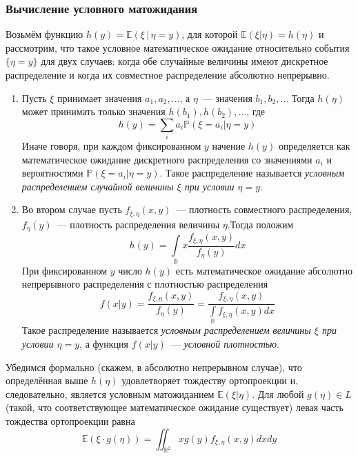 \subsubsection{Вычисление условного матожидания}
Возьмём функцию $h(y)=\mathbb{E}(\xi \,|\, \eta=y)$, для которой $\mathbb{E}(\xi | \eta)=h(\eta)$ и рассмотрим, что такое условное математическое ожидание относительно события $\{\eta=y\}$ для двух случаев: когда обе случайные величины имеют дискретное распределение и когда их совместное распределение абсолютно непрерывно.
\begin{enumerate}
    \item Пусть $\xi$ принимает значения $a_{1}, a_{2}, \ldots$, а $\eta$~--- значения $b_{1}, b_{2}, \ldots$ Тогда $h(\eta)$ может принимать только значения $h\left(b_{1}\right), h\left(b_{2}\right), \ldots$, где
    \begin{equation*}
        h(y)=\sum\limits_{i} a_{i} \mathbb{P}\left(\xi=a_{i} | \eta=y\right)
    \end{equation*}
    Иначе говоря, при каждом фиксированном $y$ начение $h(y)$ определяется как математическое ожидание дискретного распределения со значениями $a_{i}$ и вероятностями $\mathbb{P}\left(\xi=a_{i} | \eta=y\right)$. Такое распределение называется {\it условным распределением случайной величины $\xi$ при условии $\eta = y$}.
    
    \item Во втором случае пусть $f_{\xi, \eta}(x, y)$~--- плотность совместного распределения, $f_{\eta}(y)$~--- плотность распределения величины $\eta$.Тогда положим
    \begin{equation*}
        h(y)=\int\limits_{\mathbb{R}} x \frac{f_{\xi, \eta}(x, y)}{f_{\eta}(y)} d x
    \end{equation*}
    При фиксированном $y$ число $h(y)$ есть математическое ожидание абсолютно непрерывного распределения с плотностью распределения
    \begin{equation*}
        f(x | y)=\frac{f_{\xi, \eta}(x, y)}{f_{\eta}(y)}=\frac{f_{\xi, \eta}(x, y)}{\int\limits_{\mathbb{R}} f_{\xi, \eta}(x, y) d x}
    \end{equation*}
    Такое распределение называется {\it условным распределением величины $\xi$ при условии $\eta = y$}, а функция $f(x | y)$~--- {\it условной плотностью}.
\end{enumerate}

    Убедимся формально (скажем, в абсолютно непрерывном случае), что определённая выше $h(\eta)$ удовлетворяет тождеству ортопроекции и, следовательно, является условным матожиданием $\mathbb{E}(\xi | \eta)$. Для любой $g(\eta) \in L$ (такой, что соответствующее математическое ожидание существует) левая часть тождества ортопроекции равна
    \begin{equation*}
        \mathbb{E}(\xi \cdot g(\eta))=\iint_{\mathbb{R}^{2}} x g(y) f_{\xi, \eta}(x, y) d x d y
    \end{equation*}
    
